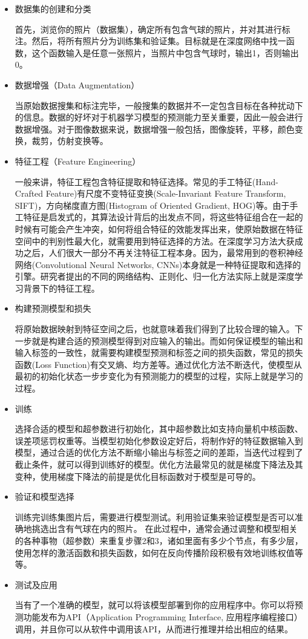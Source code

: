 \begin{itemize}
	\itemsep0em 
	\item 数据集的创建和分类

		首先，浏览你的照片（数据集），确定所有包含气球的照片，并对其进行标注。然后，将所有照片分为训练集和验证集。目标就是在深度网络中找一函数，这个函数输入是任意一张照片，当照片中包含气球时，输出1，否则输出0。

\item 数据增强（Data Augmentation）

	当原始数据搜集和标注完毕，一般搜集的数据并不一定包含目标在各种扰动下的信息。数据的好坏对于机器学习模型的预测能力至关重要，因此一般会进行数据增强。对于图像数据来说，数据增强一般包括，图像旋转，平移，颜色变换，裁剪，仿射变换等。

\item 特征工程（Feature Engineering）

	一般来讲，特征工程包含特征提取和特征选择。常见的手工特征(Hand-Crafted Feature)有尺度不变特征变换(Scale-Invariant Feature Transform, SIFT)，方向梯度直方图(Histogram of Oriented Gradient, HOG)等。由于手工特征是启发式的，其算法设计背后的出发点不同，将这些特征组合在一起的时候有可能会产生冲突，如何将组合特征的效能发挥出来，使原始数据在特征空间中的判别性最大化，就需要用到特征选择的方法。在深度学习方法大获成功之后，人们很大一部分不再关注特征工程本身。因为，最常用到的卷积神经网络(Convolutional Neural Networks, CNNs)本身就是一种特征提取和选择的引擎。研究者提出的不同的网络结构、正则化、归一化方法实际上就是深度学习背景下的特征工程。

\item 构建预测模型和损失

	将原始数据映射到特征空间之后，也就意味着我们得到了比较合理的输入。下一步就是构建合适的预测模型得到对应输入的输出。而如何保证模型的输出和输入标签的一致性，就需要构建模型预测和标签之间的损失函数，常见的损失函数(Loss Function)有交叉熵、均方差等。通过优化方法不断迭代，使模型从最初的初始化状态一步步变化为有预测能力的模型的过程，实际上就是学习的过程。

\item 训练

	选择合适的模型和超参数进行初始化，其中超参数比如支持向量机中核函数、误差项惩罚权重等。当模型初始化参数设定好后，将制作好的特征数据输入到模型，通过合适的优化方法不断缩小输出与标签之间的差距，当迭代过程到了截止条件，就可以得到训练好的模型。优化方法最常见的就是梯度下降法及其变种，使用梯度下降法的前提是优化目标函数对于模型是可导的。

\item 验证和模型选择

	训练完训练集图片后，需要进行模型测试。利用验证集来验证模型是否可以准确地挑选出含有气球在内的照片。
	在此过程中，通常会通过调整和模型相关的各种事物（超参数）来重复步骤2和3，诸如里面有多少个节点，有多少层，使用怎样的激活函数和损失函数，如何在反向传播阶段积极有效地训练权值等等。

\item 测试及应用

	当有了一个准确的模型，就可以将该模型部署到你的应用程序中。你可以将预测功能发布为API（Application Programming Interface, 应用程序编程接口）调用，并且你可以从软件中调用该API，从而进行推理并给出相应的结果。
	\end{itemize}


